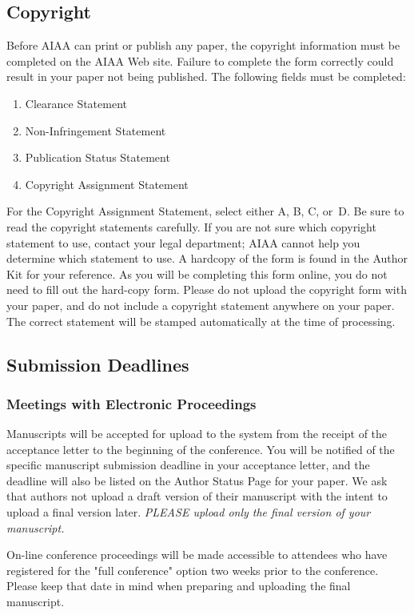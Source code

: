 \documentclass{aiaa-tc}%
\begin{document}
\subsection{Copyright}

Before AIAA can print or publish any paper, the copyright information
must be completed on the AIAA Web site.
Failure to complete the form correctly could result in your paper not
being published.
The following fields must be completed:
\begin{enumerate}
 \item Clearance Statement
 \item Non-Infringement Statement
 \item Publication Status Statement
 \item Copyright Assignment Statement
\end{enumerate}
For the Copyright Assignment Statement, select either A, B, C, or~D.
Be sure to read the copyright statements carefully.
If you are not sure which copyright statement to use, contact your legal
department; AIAA cannot help you determine which statement to use.
A hardcopy of the form is found in the Author Kit for your reference.
As you will be completing this form online, you do not need to fill out
the hard-copy form. Please do not upload the copyright form with your
paper, and do not include a copyright statement anywhere on your
paper. The correct statement will be stamped automatically at the time
of processing.

\subsection{Submission Deadlines}

\subsubsection{Meetings with Electronic Proceedings}

Manuscripts will be accepted for upload to the system from the receipt
of the acceptance letter to the beginning of the conference. You will be
notified of the specific manuscript submission deadline in your
acceptance letter, and the deadline will also be listed on the Author
Status Page for your paper. We ask that authors not upload a draft version
of their manuscript with the intent to upload a final version  later.
\emph{PLEASE upload only the final version of your manuscript.}

On-line conference proceedings will be made accessible to attendees
who have registered for the "full conference" option two weeks prior to
the conference. Please keep that date in mind when preparing and
uploading the final manuscript.
\end{document}
